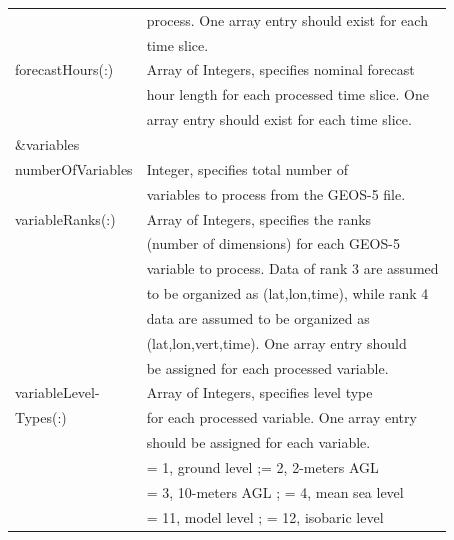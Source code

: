 \begin{tabular}{|l|l|}
& process. One array entry should exist for each \\
& time slice. \\ \hline
forecastHours(:) & Array of Integers, specifies nominal forecast \\ 
& hour length for each processed time slice. One \\
& array entry should exist for each time slice. \\ \hline 
\&variables & \\ \hline
numberOfVariables & Integer, specifies total number of \\
& variables to process from the GEOS-5 file. \\ \hline
variableRanks(:) & Array of Integers, specifies the ranks \\ 
 & (number of dimensions) for each GEOS-5 \\ 
 & variable to process. Data of rank 3 are assumed \\
 & to be organized as (lat,lon,time), while rank 4 \\
 & data are assumed to be organized as \\
 & (lat,lon,vert,time). One array entry should \\
 & be assigned for each processed variable. \\ \hline
 variableLevel- & Array of Integers, specifies level type \\
 Types(:)&for each processed variable. One array entry \\
 & should be assigned for each variable. \\
 & = 1, ground level ;= 2, 2-meters AGL \\
 & = 3, 10-meters AGL ; = 4, mean sea level \\
 & = 11, model level ; = 12, isobaric level \\ \hline
 \end{tabular} \\
 
